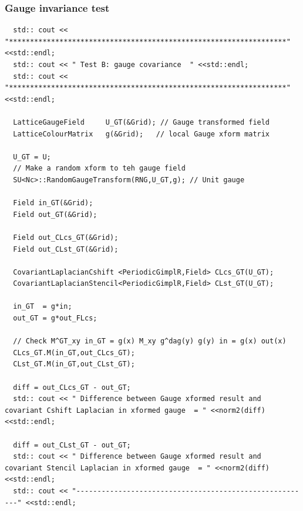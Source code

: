 \documentclass[pdf,ps,8pt]{beamer}
\newcommand{\miniscule}{\fontsize{3pt}{4pt}\selectfont}
\begin{document}
  \begin{frame}[fragile]\small\frametitle{ Gauge invariance test}
{\miniscule
  \begin{verbatim}
  std:: cout << "******************************************************************" <<std::endl;
  std:: cout << " Test B: gauge covariance  " <<std::endl;
  std:: cout << "******************************************************************" <<std::endl;

  LatticeGaugeField     U_GT(&Grid); // Gauge transformed field
  LatticeColourMatrix   g(&Grid);   // local Gauge xform matrix

  U_GT = U;
  // Make a random xform to teh gauge field
  SU<Nc>::RandomGaugeTransform(RNG,U_GT,g); // Unit gauge

  Field in_GT(&Grid); 
  Field out_GT(&Grid);

  Field out_CLcs_GT(&Grid);
  Field out_CLst_GT(&Grid);

  CovariantLaplacianCshift <PeriodicGimplR,Field> CLcs_GT(U_GT);
  CovariantLaplacianStencil<PeriodicGimplR,Field> CLst_GT(U_GT);

  in_GT  = g*in;
  out_GT = g*out_FLcs;

  // Check M^GT_xy in_GT = g(x) M_xy g^dag(y) g(y) in = g(x) out(x)
  CLcs_GT.M(in_GT,out_CLcs_GT);
  CLst_GT.M(in_GT,out_CLst_GT);

  diff = out_CLcs_GT - out_GT;
  std:: cout << " Difference between Gauge xformed result and covariant Cshift Laplacian in xformed gauge  = " <<norm2(diff)<<std::endl;

  diff = out_CLst_GT - out_GT;
  std:: cout << " Difference between Gauge xformed result and covariant Stencil Laplacian in xformed gauge  = " <<norm2(diff)<<std::endl;
  std:: cout << "--------------------------------------------------------" <<std::endl;
  \end{verbatim}
}
  \end{frame}
\end{document}
